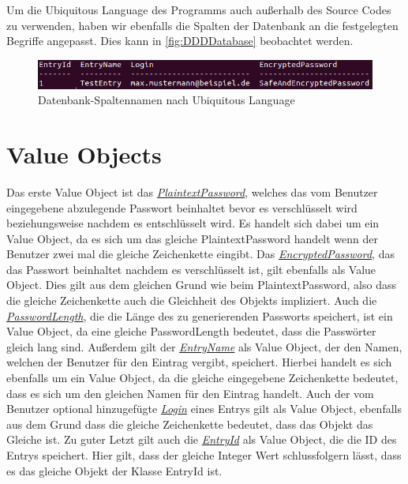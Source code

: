 Um die Ubiquitous Language des Programms auch außerhalb des Source Codes zu verwenden, haben wir ebenfalls die Spalten der Datenbank an die festgelegten Begriffe angepasst. Dies kann in \autoref{fig:DDDDatabase} beobachtet werden.

\begin{figure}[ht]
	\centering
	\includegraphics[width=1.0\textwidth]{Bilder/DDD_column_names.png}
	\caption{Datenbank-Spaltennamen nach Ubiquitous Language}
	\label{fig:DDDDatabase}
\end{figure}

\section{Value Objects}
Das erste Value Object ist das \href{https://github.com/moorts/Morik/blob/main/src/application/PlaintextPassword.h}{\textit{PlaintextPassword}}, welches das vom Benutzer eingegebene abzulegende Passwort beinhaltet bevor es verschlüsselt wird beziehungsweise nachdem es entschlüsselt wird. Es handelt sich dabei um ein Value Object, da es sich um das gleiche PlaintextPassword handelt wenn der Benutzer zwei mal die gleiche Zeichenkette eingibt. Das \href{https://github.com/moorts/Morik/blob/main/src/application/EncryptedPassword.h}{\textit{EncryptedPassword}}, das das Passwort beinhaltet nachdem es verschlüsselt ist, gilt ebenfalls als Value Object. Dies gilt aus dem gleichen Grund wie beim PlaintextPassword, also dass die gleiche Zeichenkette auch die Gleichheit des Objekts impliziert. Auch die \href{https://github.com/moorts/Morik/blob/main/src/application/PasswordLength.h}{\textit{PasswordLength}}, die die Länge des zu generierenden Passworts speichert, ist ein Value Object, da eine gleiche PasswordLength bedeutet, dass die Passwörter gleich lang sind. Außerdem gilt der \href{https://github.com/moorts/Morik/blob/main/src/application/EntryName.h}{\textit{EntryName}} als Value Object, der den Namen, welchen der Benutzer für den Eintrag vergibt, speichert. Hierbei handelt es sich ebenfalls um ein Value Object, da die gleiche eingegebene Zeichenkette bedeutet, dass es sich um den gleichen Namen für den Eintrag handelt. Auch der vom Benutzer optional hinzugefügte \href{https://github.com/moorts/Morik/blob/main/src/application/Login.h}{\textit{Login}} eines Entrys gilt als Value Object, ebenfalls aus dem Grund dass die gleiche Zeichenkette bedeutet, dass das Objekt das Gleiche ist. Zu guter Letzt gilt auch die \href{https://github.com/moorts/Morik/blob/main/src/application/EntryId.h}{\textit{EntryId}} als Value Object, die die ID des Entrys speichert. Hier gilt, dass der gleiche Integer Wert schlussfolgern lässt, dass es das gleiche Objekt der Klasse EntryId ist.

